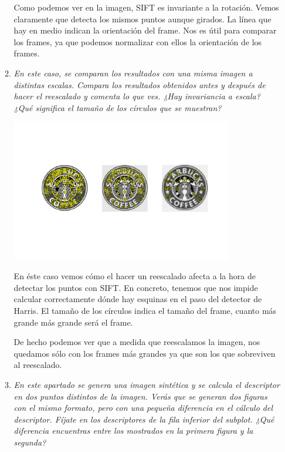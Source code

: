 \documentclass{article}
\begin{document}
\begin{enumerate}
\begin{enumerate}
Como podemos ver en la imagen, SIFT es invariante a la rotación. Vemos claramente que detecta los mismos puntos aunque girados. La línea que hay en medio indican la orientación del frame. Nos es útil para comparar los frames, ya que podemos normalizar con ellos la orientación de los frames.

 \item \textit{En  este  caso,  se  comparan  los  resultados  con  una  misma  imagen  a 
distintas  escalas.  Compara  los  resultados  obtenidos  antes  y  después  de 
hacer el reescalado y comenta lo que ves. ¿Hay invariancia a escala? ¿Qué 
significa el tamaño de los círculos que se muestran?}

\begin{center}
	\includegraphics[width=0.8\textwidth]{ej34c.png}
\end{center}

En éste caso vemos cómo el hacer un reescalado afecta a la hora de detectar los puntos con SIFT. En concreto, tenemos que nos impide calcular correctamente dónde hay esquinas en el paso del detector de Harris. El tamaño de los círculos indica el tamaño del frame, cuanto más grande más grande será el frame.

De hecho podemos ver que a medida que reescalamos la imagen, nos quedamos sólo con los frames más grandes ya que son los que sobreviven al reescalado.

 \item \textit{En este apartado se genera una imagen sintética y se calcula el descriptor 
en dos puntos distintos de la imagen.  Verás  que  se generan dos  figuras 
con el mismo  formato, pero con una pequeña diferencia en el cálculo del 
descriptor.  Fíjate  en los  descriptores  de la  fila inferior  del subplot.  ¿Qué 
diferencia  encuentras  entre  los  mostrados  en  la  primera  figura  y  la 
segunda?}


\end{enumerate}
\end{enumerate}
\end{document}
